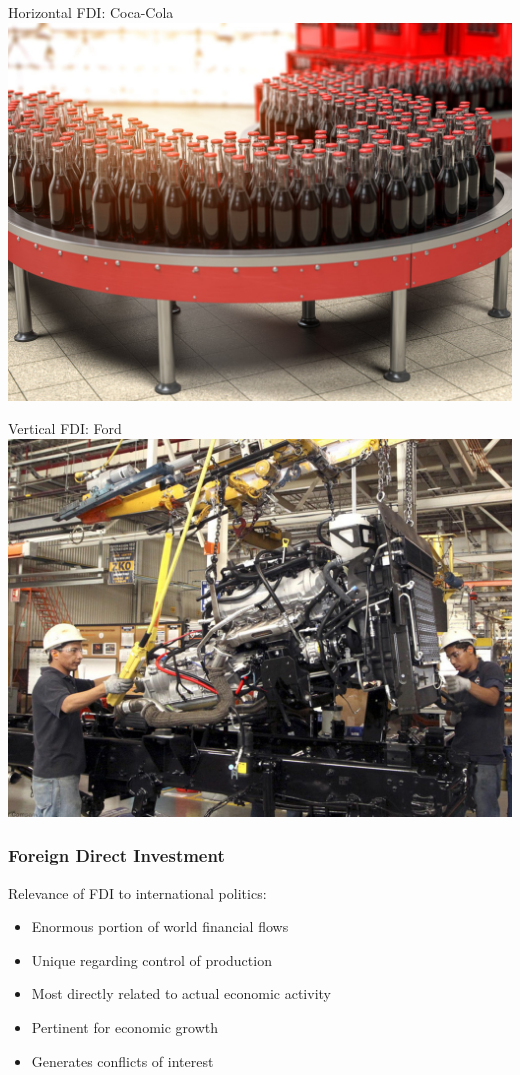 \documentclass[handout]{beamer}
\begin{document}
\begin{frame}{\LARGE Horizontal FDI: Coca-Cola}
	\centering
	\includegraphics[width=\textwidth,height=0.8\textheight,keepaspectratio]{Coca Cola.jpg}
\end{frame}

\begin{frame}{\LARGE Vertical FDI: Ford}
	\centering
	\includegraphics[width=\textwidth,height=0.8\textheight,keepaspectratio]{Ford in Mexico.jpg}
\end{frame}

\begin{frame} 
	\frametitle{\LARGE{Foreign Direct Investment}}
	Relevance of FDI to international politics: \pause 
	\begin{itemize}
		\item Enormous portion of world financial flows \pause 
		\item Unique regarding control of production \pause 
		\item Most directly related to actual economic activity \pause 
		\item Pertinent for economic growth \pause 
		\item Generates conflicts of interest
	\end{itemize}		
	
\end{frame}
\end{document}
